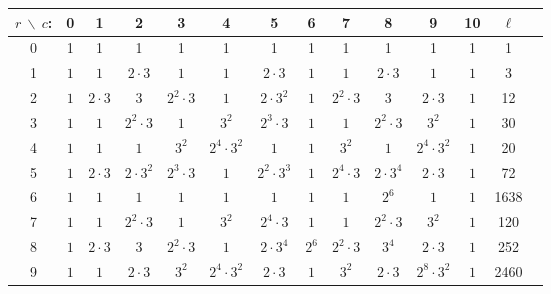 {\tiny\rm

\begin{table}\label{tab:n6}
  \begin{center}
    \begin{adjustbox}{max width=\textwidth}
    \begin{tabular}{|c|cccccccccccc|c|}
      \hline
$r\ \backslash\ c$:&0 &1 &2 &3 &4 &5 &6 &7 &8 &9 &10 %
&$\ell$
\\
      \hline
      \hline
	    0 & 1 & 1 & 1 & 1 & 1 & 1 & 1 & 1 &1 &1 &1 &1\\
1 &$1$ &$1$ &$2\cdot 3$ &$1$ &$1$ &$2\cdot 3$ &$1$ &$1$ &$2\cdot 3$ &$1$ &$1$ &3\\
2 &$1$ &$2\cdot 3$ &$3$ &$2^{2}\cdot 3$ &$1$ &$2\cdot 3^{2}$ &$1$ &$2^{2}\cdot 3$ &$3$ &$2\cdot 3$ &$1$ &12\\
3 &$1$ &$1$ &$2^{2}\cdot 3$ &$1$ &$3^{2}$ &$2^{3}\cdot 3$ &$1$ &$1$ &$2^{2}\cdot 3$ &$3^{2}$ &$1$ &30\\
4 &$1$ &$1$ &$1$ &$3^{2}$ &$2^{4}\cdot 3^{2}$ &$1$ &$1$ &$3^{2}$ &$1$ &$2^{4}\cdot 3^{2}$ &$1$ &20\\
5 &$1$ &$2\cdot 3$ &$2\cdot 3^{2}$ &$2^{3}\cdot 3$ &$1$ &$2^{2}\cdot 3^{3}$ &$1$ &$2^{4}\cdot 3$ &$2\cdot 3^{4}$ &$2\cdot 3$ &$1$ &72\\
6 &$1$ &$1$ &$1$ &$1$ &$1$ &$1$ &$1$ &$1$ &$2^{6}$ &$1$ &$1$ &1638\\
7 &$1$ &$1$ &$2^{2}\cdot 3$ &$1$ &$3^{2}$ &$2^{4}\cdot 3$ &$1$ &$1$ &$2^{2}\cdot 3$ &$3^{2}$ &$1$ &120\\
8 &$1$ &$2\cdot 3$ &$3$ &$2^{2}\cdot 3$ &$1$ &$2\cdot 3^{4}$ &$2^{6}$ &$2^{2}\cdot 3$ &$3^{4}$ &$2\cdot 3$ &$1$ &252\\
9 &$1$ &$1$ &$2\cdot 3$ &$3^{2}$ &$2^{4}\cdot 3^{2}$ &$2\cdot 3$ &$1$ &$3^{2}$ &$2\cdot 3$ &$2^{8}\cdot 3^{2}$ &$1$ &2460\\

\end{tabular}
\end{adjustbox}
\end{center}
\end{table}}
